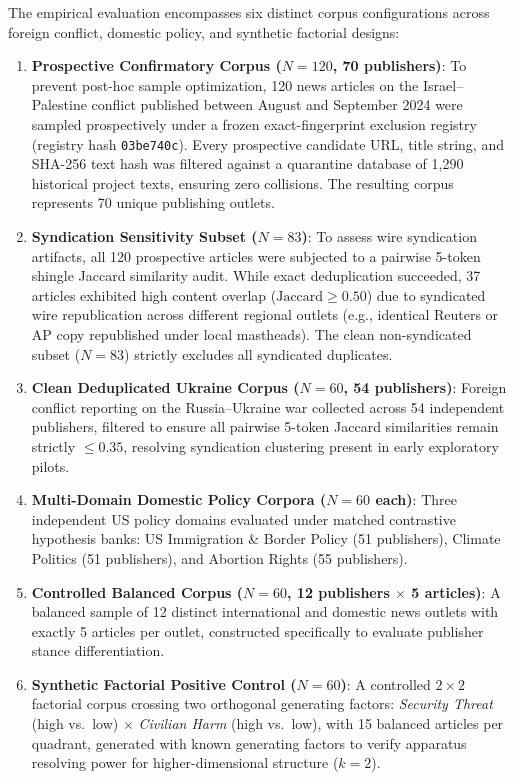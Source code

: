 The empirical evaluation encompasses six distinct corpus configurations across foreign conflict, domestic policy, and synthetic factorial designs:
\begin{enumerate}
    \item \textbf{Prospective Confirmatory Corpus ($N=120$, 70 publishers)}: To prevent post-hoc sample optimization, 120 news articles on the Israel--Palestine conflict published between August and September 2024 were sampled prospectively under a frozen exact-fingerprint exclusion registry (registry hash \texttt{03be740c}). Every prospective candidate URL, title string, and SHA-256 text hash was filtered against a quarantine database of 1,290 historical project texts, ensuring zero collisions. The resulting corpus represents 70 unique publishing outlets.
    \item \textbf{Syndication Sensitivity Subset ($N=83$)}: To assess wire syndication artifacts, all 120 prospective articles were subjected to a pairwise 5-token shingle Jaccard similarity audit. While exact deduplication succeeded, 37 articles exhibited high content overlap ($\text{Jaccard} \ge 0.50$) due to syndicated wire republication across different regional outlets (e.g., identical Reuters or AP copy republished under local mastheads). The clean non-syndicated subset ($N=83$) strictly excludes all syndicated duplicates.
    \item \textbf{Clean Deduplicated Ukraine Corpus ($N=60$, 54 publishers)}: Foreign conflict reporting on the Russia--Ukraine war collected across 54 independent publishers, filtered to ensure all pairwise 5-token Jaccard similarities remain strictly $\le 0.35$, resolving syndication clustering present in early exploratory pilots.
    \item \textbf{Multi-Domain Domestic Policy Corpora ($N=60$ each)}: Three independent US policy domains evaluated under matched contrastive hypothesis banks: US Immigration \& Border Policy (51 publishers), Climate Politics (51 publishers), and Abortion Rights (55 publishers).
    \item \textbf{Controlled Balanced Corpus ($N=60$, 12 publishers $\times$ 5 articles)}: A balanced sample of 12 distinct international and domestic news outlets with exactly 5 articles per outlet, constructed specifically to evaluate publisher stance differentiation.
    \item \textbf{Synthetic Factorial Positive Control ($N=60$)}: A controlled $2 \times 2$ factorial corpus crossing two orthogonal generating factors: \emph{Security Threat} (high vs.\ low) $\times$ \emph{Civilian Harm} (high vs.\ low), with 15 balanced articles per quadrant, generated with known generating factors to verify apparatus resolving power for higher-dimensional structure ($k=2$).
\end{enumerate}

